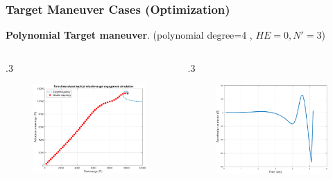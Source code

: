 \documentclass{beamer}
\begin{document}
\begin{frame}
\frametitle{Target Maneuver Cases (Optimization)}
	\textbf{Polynomial Target maneuver}. (polynomial degree=4 , $HE=0 , N'=3$)
	\begin{columns}[c]
		\begin{column} {.3\linewidth}
			\begin{figure}[H]
				\centering
				\includegraphics[scale = 0.18]{fig/trajectoryP4N3.pdf}
				\label{trajectoryP3}
			\end{figure}
		\end{column}
		
		\begin{column} {.3\linewidth}
			\begin{figure}[H]
				\centering
				\includegraphics[scale = 0.18]{fig/MissileAccelerationP4N3.pdf}
			\end{figure}
		\end{column}
		

\end{columns}
\end{frame}
\end{document}
